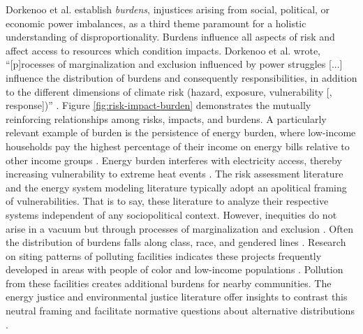 Dorkenoo et al. \cite{dorkenoo_critical_2022} establish \textit{burdens},
injustices arising from social, political, or economic power imbalances, as a
third theme paramount for a holistic understanding of disproportionality.
Burdens influence all aspects of risk and affect access to resources which
condition impacts. Dorkenoo et al. wrote, ``[p]rocesses of marginalization and
exclusion influenced by power struggles [...] influence the distribution of
burdens and consequently responsibilities, in addition to the different
dimensions of climate risk (hazard, exposure, vulnerability [, response])''
\cite{dorkenoo_critical_2022}. Figure \ref{fig:risk-impact-burden} demonstrates
the mutually reinforcing relationships among risks, impacts, and burdens. A
particularly relevant example of burden is the persistence of energy burden,
where low-income households pay the highest percentage of their income on energy
bills relative to other income groups \cite{brown_high_2020,
cong_unveiling_2022}. Energy burden interferes with electricity access, thereby
increasing vulnerability to extreme heat events \cite{cong_unveiling_2022,
klinenberg_heat_2003}. The risk assessment literature and the energy system
modeling literature typically adopt an apolitical framing of vulnerabilities.
That is to say, these literature to analyze their respective systems independent
of any sociopolitical context.
However, inequities do not arise in a vacuum but through processes of
marginalization and exclusion \cite{thomas_explaining_2019}. Often the
distribution of burdens falls along class, race, and gendered lines
\cite{thomas_explaining_2019,mohai_which_2015}. Research on siting patterns of
polluting facilities indicates these projects frequently developed in areas with
people of color and low-income populations \cite{mohai_which_2015}. Pollution
from these facilities creates additional burdens for nearby communities. The
energy justice and environmental justice literature offer insights to contrast
this neutral framing and facilitate normative questions about alternative
distributions \cite{dorkenoo_critical_2022, thomas_explaining_2019}.

